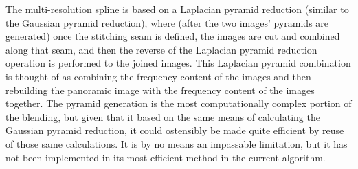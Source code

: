 The multi-resolution spline is based on a Laplacian pyramid reduction (similar to the Gaussian pyramid reduction), where (after the two images' pyramids are generated) once the stitching seam is defined, the images are cut and combined along that seam, and then the reverse of the Laplacian pyramid reduction operation is performed to the joined images. This Laplacian pyramid combination is thought of as combining the frequency content of the images and then rebuilding the panoramic image with the frequency content of the images together. The pyramid generation is the most computationally complex portion of the blending, but given that it based on the same means of calculating the Gaussian pyramid reduction, it could ostensibly be made quite efficient by reuse of those same calculations. It is by no means an impassable limitation, but it has not been implemented in its most efficient method in the current algorithm.



